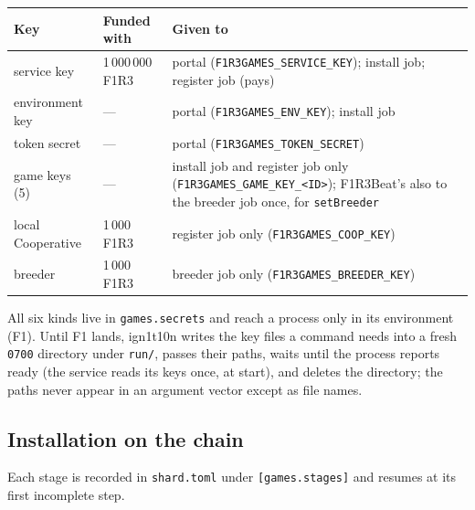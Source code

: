 \documentclass[11pt]{article}
\theoremstyle{definition}
\theoremstyle{remark}
\newcommand{\code}[1]{\texttt{#1}}
\newcommand{\Hr}{ign1t10n}
\begin{document}
\begin{center}\small
\renewcommand{\arraystretch}{1.15}
\begin{tabularx}{\linewidth}{@{}>{\raggedright\arraybackslash}p{2.6cm}p{2.4cm}>{\raggedright\arraybackslash}X@{}}
\toprule
Key & Funded with & Given to\\
\midrule
service key & 1\,000\,000 F1R3 & portal (\code{F1R3GAMES\_SERVICE\_KEY}); install job; register job (pays)\\
environment key & --- & portal (\code{F1R3GAMES\_ENV\_KEY}); install job\\
token secret & --- & portal (\code{F1R3GAMES\_TOKEN\_SECRET})\\
game keys (5) & --- & install job and register job only (\code{F1R3GAMES\_GAME\_KEY\_<ID>}); F1R3Beat's also to the breeder job once, for \code{setBreeder}\\
local Cooperative & 1\,000 F1R3 & register job only (\code{F1R3GAMES\_COOP\_KEY})\\
breeder & 1\,000 F1R3 & breeder job only (\code{F1R3GAMES\_BREEDER\_KEY})\\
\bottomrule
\end{tabularx}
\end{center}

\noindent
All six kinds live in \code{games.secrets} and reach a process only in its
environment (F1). Until F1 lands, \Hr{} writes the key files a command needs into a
fresh \code{0700} directory under \code{run/}, passes their paths, waits until the
process reports ready (the service reads its keys once, at start), and deletes the
directory; the paths never appear in an argument vector except as file names.

\subsection{Installation on the chain}\label{sec:gstages}

Each stage is recorded in \code{shard.toml} under \code{[games.stages]} and resumes
at its first incomplete step.
\end{document}
